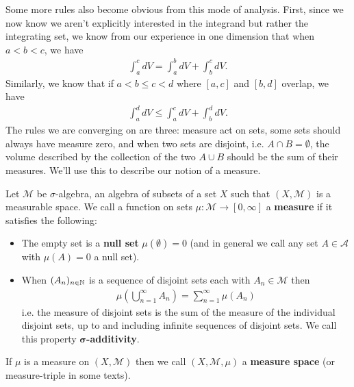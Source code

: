 \documentclass[11pt]{article}
\begin{document}
Some more rules also become obvious from this mode of analysis. First, since we now know we aren't explicitly interested in the integrand but rather the integrating set, we know from our experience in one dimension that when $a < b < c$, we have \begin{gather*}
\int_a^c dV = \int_a^b dV + \int_b^c dV.
\end{gather*}
Similarly, we know that if $a< b \le c < d$ where $[a,c]$ and $[b,d]$ overlap, we have \begin{gather*}
\int_a^d dV \le \int_a^c dV + \int_b^d dV.
\end{gather*}
The rules we are converging on are three: measure act on sets, some sets should always have measure zero, and when two sets are disjoint, i.e. $A \cap B = \emptyset$, the volume described by the collection of the two $A \cup B$ should be the sum of their measures. We'll use this to describe our notion of a measure.

\begin{definition}[Measure]
Let $\mathcal M$ be $\sigma$-algebra, an algebra of subsets of a set $X$ such that $(X,\mathcal M)$ is a measurable space. We call a function on sets $\mu : \mathcal M \to [0,\infty]$ a \textbf{measure} if it satisfies the following: \begin{itemize}
\item The empty set is a \textbf{null set} $\mu(\emptyset) = 0$ (and in general we call any set $A \in \mathcal A$ with $\mu(A)= 0$ a null set).
\item When $(A_n)_{n \in \mathbb{N}}$ is a sequence of disjoint sets each with $A_n \in \mathcal M$ then \begin{gather*}
\mu \left( \bigcup_{n = 1}^\infty A_n \right) = \sum_{n=1}^\infty \mu(A_n)
\end{gather*}
i.e. the measure of disjoint sets is the sum of the measure of the individual disjoint sets, up to and including infinite sequences of disjoint sets. We call this property $\mathbf{\sigma}$\textbf{-additivity}.
\end{itemize}
If $\mu$ is a measure on $(X,\mathcal M)$ then we call $(X,\mathcal M, \mu)$ a \textbf{measure space} (or measure-triple in some texts).
\end{definition}
\end{document}
